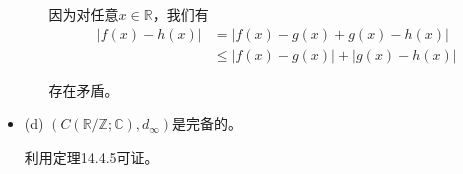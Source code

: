 \documentclass{article}
\begin{document}
\begin{itemize}
\begin{itemize}
                因为对任意$x \in \mathbb{R}$，我们有
                \begin{align*}
                  |f(x) - h(x)| & = |f(x) - g(x) + g(x) - h(x)|      \\
                                & \leq |f(x) - g(x)| + |g(x) - h(x)|
                \end{align*}

                存在矛盾。

        \end{itemize}


  \item (d) $(C(\mathbb{R}/\mathbb{Z}; \mathbb{C}),d_{\infty})$是完备的。

        利用定理14.4.5可证。



\end{itemize}
\end{document}
